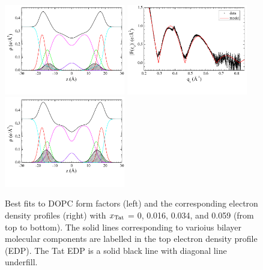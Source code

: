 \begin{figure}[htbp]
  \includegraphics[trim=5 30 0 0,clip=true,width=0.47\textwidth]{figures/Tat/SDP_Results/EDP/DOPC_Tat_28to1_3p0_EDP1}
  \includegraphics[trim=5 30 0 0,clip=true,width=0.47\textwidth]{figures/Tat/SDP_Results/XFF/DOPC_Tat_16to1_3p0_XFF1}
  \includegraphics[trim=5 30 0 0,clip=true,width=0.47\textwidth]{figures/Tat/SDP_Results/EDP/DOPC_Tat_16to1_3p0_EDP1}
  \caption[Best fits to DOPC form factors (left) and the corresponding 
  electron density profiles (right) with $\xTat$ = 0, 0.016, 0.034, 
  and 0.059 (from top to bottom)]
  {Best fits to DOPC form factors (left) and the corresponding 
  electron density profiles (right) with $\xTat$ = 0, 0.016, 0.034, 
  and 0.059 (from top to bottom).
  The solid lines corresponding to varioius bilayer molecular components are 
  labelled in the top electron density profile (EDP). The Tat EDP is a solid black
  line with diagonal line underfill.}
  \label{fig:DOPC_Tat_XFF1}
\end{figure}

